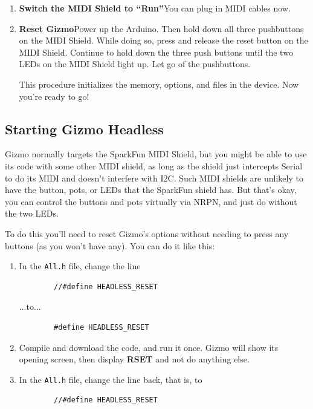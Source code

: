 \documentclass{article}
\begin{document}
\begin{enumerate}
\item {\bf Switch the MIDI Shield to ``Run''}\quad  You can plug in MIDI cables now.

\item {\bf Reset Gizmo}\quad Power up the Arduino.  Then hold down all three pushbuttons on the MIDI Shield.  While doing so, press and release the reset button on the MIDI Shield.  Continue to hold down the three push buttons until the two LEDs on the MIDI Shield light up.  Let go of the pushbuttons.  

This procedure initializes the memory, options, and files in the device.  Now you're ready to go!

\end{enumerate}

\subsection{Starting Gizmo Headless}

Gizmo normally targets the SparkFun MIDI Shield, but you might be able to use its code with some other MIDI shield, as long as the shield just intercepts Serial to do its MIDI and doesn't interfere with I2C.  Such MIDI shields are unlikely to have the button, pots, or LEDs that the SparkFun shield has.  But that's okay, you can control the buttons and pots virtually via NRPN, and just do without the two LEDs.

To do this you'll need to reset Gizmo's options without needing to press any buttons (as you won't have any).  You can do it like this:

\begin{enumerate}
\item In the \texttt{All.h} file, change the line 
\begin{verbatim}
        //#define HEADLESS_RESET
\end{verbatim}
...to...
\begin{verbatim}
        #define HEADLESS_RESET
\end{verbatim}
\item Compile and download the code, and run it once.  Gizmo will show its opening screen, then display {\bf RSET} and not do anything else.
\item In the \texttt{All.h} file, change the line back, that is, to 
\begin{verbatim}
        //#define HEADLESS_RESET
\end{verbatim}

\end{enumerate}
\end{document}
